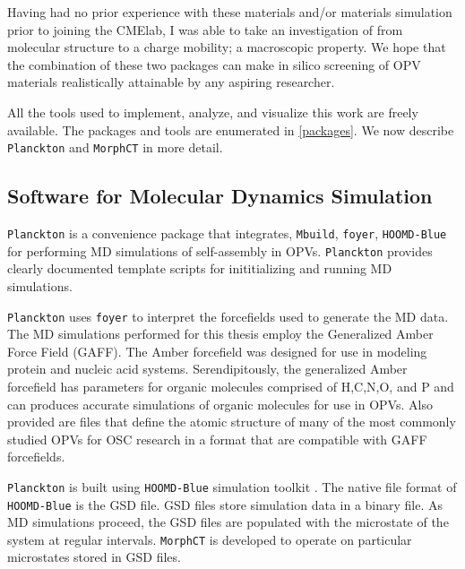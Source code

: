 Having had no prior experience with these materials and/or materials simulation prior to joining the CMElab,
I was able to take an investigation of  from molecular
structure to a charge mobility; a macroscopic property. We hope that the combination of these two packages
can make in silico screening of OPV materials realistically attainable by any aspiring researcher.

All the tools used to implement, analyze, and
visualize this work are freely available. 
The packages and tools are enumerated in \autoref{packages}. We now describe \texttt{Planckton} and 
\texttt{MorphCT} in more detail.

\subsection{Software for Molecular Dynamics Simulation}

\label{planckton}

\texttt{Planckton} is a convenience package that integrates, \texttt{Mbuild}, \texttt{foyer},
\texttt{HOOMD-Blue} for performing MD simulations of self-assembly in OPVs.  \texttt{Planckton}
provides clearly documented template scripts for inititializing and running MD simulations. 
 
\texttt{Planckton} uses \texttt{foyer} to interpret the forcefields used to generate the MD data. The MD
simulations performed for this thesis employ the Generalized Amber Force Field (GAFF)\cite{Wang2004}.
The Amber forcefield was designed for use in modeling protein and
nucleic acid systems. Serendipitously, the generalized Amber forcefield has parameters for organic molecules
comprised of H,C,N,O, and P and can produces accurate simulations of organic molecules for use in OPVs. 
Also provided are files that define the atomic structure of many of
the most commonly studied OPVs for OSC research in a format that are compatible with GAFF forcefields.

\texttt{Planckton} is built using \texttt{HOOMD-Blue} simulation toolkit \cite{Anderson2020a}.
The native file format of \texttt{HOOMD-Blue} is the GSD file. GSD files store simulation data in a binary file. 
As MD simulations proceed, the GSD files are populated with the microstate of the system at regular intervals.
\texttt{MorphCT} is developed to operate on particular microstates stored in GSD files.

